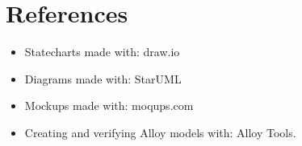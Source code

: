 \section{References}

\begin{itemize}
    \setlength{\itemsep}{0pt}
    \setlength{\parskip}{8pt}
    \setlength{\parsep}{0pt}
    \setlength{\partopsep}{0pt}
    \setlength{\topsep}{0pt}
    \item Statecharts made with: draw.io
    \item Diagrams made with: StarUML
    \item Mockups made with: moqups.com
    \item Creating and verifying Alloy models with: Alloy Tools.

\end{itemize}